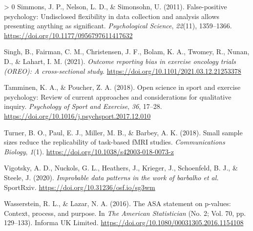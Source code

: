 \documentclass[]{cik}%
\newlength{\cslhangindent}
\newenvironment{CSLReferences}[3] %
 {%
  \setlength{\parindent}{0pt}
  \ifodd #1 \everypar{\setlength{\hangindent}{\cslhangindent}}\ignorespaces\fi
  \ifnum #2 > 0
  \setlength{\parskip}{#2\baselineskip}
  \fi
 }%
 {}
\begin{document}
\begin{CSLReferences}{1}{0}
\leavevmode\hypertarget{ref-simmons_false-positive_2011}{}%
Simmons, J. P., Nelson, L. D., \& Simonsohn, U. (2011). False-positive
psychology: Undisclosed flexibility in data collection and analysis
allows presenting anything as significant. \emph{Psychological Science},
\emph{22}(11), 1359--1366.
\url{https://doi.org/10.1177/0956797611417632}

\leavevmode\hypertarget{ref-Singh2021}{}%
Singh, B., Fairman, C. M., Christensen, J. F., Bolam, K. A., Twomey, R.,
Nunan, D., \& Lahart, I. M. (2021). \emph{Outcome reporting bias in
exercise oncology trials ({OREO}): A cross-sectional study}.
\url{https://doi.org/10.1101/2021.03.12.21253378}

\leavevmode\hypertarget{ref-Tamminen_Poucher_2018}{}%
Tamminen, K. A., \& Poucher, Z. A. (2018). Open science in sport and
exercise psychology: Review of current approaches and considerations for
qualitative inquiry. \emph{Psychology of Sport and Exercise}, \emph{36},
17--28. \url{https://doi.org/10.1016/j.psychsport.2017.12.010}

\leavevmode\hypertarget{ref-Turner_Paul_Miller_Barbey_2018}{}%
Turner, B. O., Paul, E. J., Miller, M. B., \& Barbey, A. K. (2018).
Small sample sizes reduce the replicability of task-based fMRI studies.
\emph{Communications Biology}, \emph{1}(1).
\url{https://doi.org/10.1038/s42003-018-0073-z}

\leavevmode\hypertarget{ref-Vigotsky_Nuckols_Heathers_Krieger_Schoenfeld_Steele_2020}{}%
Vigotsky, A. D., Nuckols, G. L., Heathers, J., Krieger, J., Schoenfeld,
B. J., \& Steele, J. (2020). \emph{Improbable data patterns in the work
of barbalho et al.} SportRxiv.
\url{https://doi.org/10.31236/osf.io/sg3wm}

\leavevmode\hypertarget{ref-wasserstein2016asa}{}%
Wasserstein, R. L., \& Lazar, N. A. (2016). The {ASA} statement on
p-values: Context, process, and purpose. In \emph{The American
Statistician} (No. 2; Vol. 70, pp. 129--133). Informa {UK} Limited.
\url{https://doi.org/10.1080/00031305.2016.1154108}

\end{CSLReferences}

%
%

%
%
%
%
\end{document}
